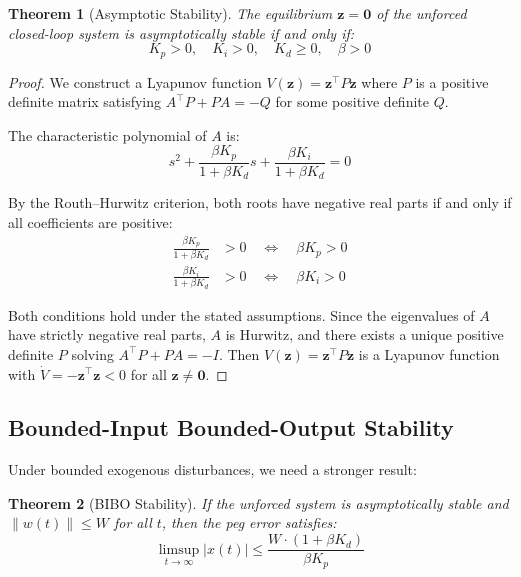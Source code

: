 \documentclass[11pt,a4paper]{article}
\newtheorem{theorem}{Theorem}
\begin{document}
\begin{theorem}[Asymptotic Stability]
\label{thm:stability}
The equilibrium $\mathbf{z} = \mathbf{0}$ of the unforced closed-loop system is asymptotically stable if and only if:
\begin{equation}
  K_p > 0, \quad K_i > 0, \quad K_d \geq 0, \quad \beta > 0
\end{equation}
\end{theorem}

\begin{proof}
We construct a Lyapunov function $V(\mathbf{z}) = \mathbf{z}^\top P \mathbf{z}$ where $P$ is a positive definite matrix satisfying $A^\top P + P A = -Q$ for some positive definite $Q$.

The characteristic polynomial of $A$ is:
\begin{equation}
  s^2 + \frac{\beta K_p}{1 + \beta K_d} s + \frac{\beta K_i}{1 + \beta K_d} = 0
\end{equation}

By the Routh--Hurwitz criterion, both roots have negative real parts if and only if all coefficients are positive:
\begin{align}
  \frac{\beta K_p}{1 + \beta K_d} &> 0 \quad \Leftrightarrow \quad \beta K_p > 0 \\
  \frac{\beta K_i}{1 + \beta K_d} &> 0 \quad \Leftrightarrow \quad \beta K_i > 0
\end{align}

Both conditions hold under the stated assumptions.
Since the eigenvalues of $A$ have strictly negative real parts, $A$ is Hurwitz, and there exists a unique positive definite $P$ solving $A^\top P + P A = -I$.
Then $V(\mathbf{z}) = \mathbf{z}^\top P \mathbf{z}$ is a Lyapunov function with $\dot{V} = -\mathbf{z}^\top \mathbf{z} < 0$ for all $\mathbf{z} \neq \mathbf{0}$.
\end{proof}

\subsection{Bounded-Input Bounded-Output Stability}

Under bounded exogenous disturbances, we need a stronger result:

\begin{theorem}[BIBO Stability]
\label{thm:bibo}
If the unforced system is asymptotically stable and $\|w(t)\| \leq W$ for all $t$, then the peg error satisfies:
\begin{equation}
  \limsup_{t \to \infty} |x(t)| \leq \frac{W \cdot (1 + \beta K_d)}{\beta K_p}
  \label{eq:bibo_bound}
\end{equation}
\end{theorem}
\end{document}
